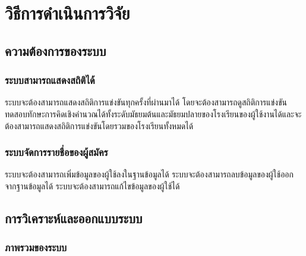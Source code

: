 \chapter{วิธีการดำเนินการวิจัย}
\label{chapter:experiment}



\section{ความต้องการของระบบ}

\subsection{ระบบสามารถแสดงสถิติได้}

ระบบจะต้องสามารถแสดงสถิติการแข่งขันทุกครั้งที่ผ่านมาได้ โดยจะต้องสามารถดูสถิติการแข่งขันทดสอบทักษะการคิดเชิงคำนวณได้ทั้งระดับมัธยมต้นและมัธยมปลายของโรงเรียนของผู้ใช้งานได้และจะต้องสามารถแสดงสถิติการแข่งขันโดยรวมของโรงเรียนทั้งหมดได้

\subsection{ระบบจัดการรายชื่อของผู้สมัคร}

ระบบจะต้องสามารถเพิ่มข้อมูลของผู้ใช้ลงในฐานข้อมูลได้ ระบบจะต้องสามารถลบข้อมูลของผู้ใช้ออกจากฐานข้อมูลได้ ระบบจะต้องสามารถแก้ไขข้อมูลของผู้ใช้ได้

\section{การวิเคราะห์และออกแบบระบบ}
\subsection{ภาพรวมของระบบ}

